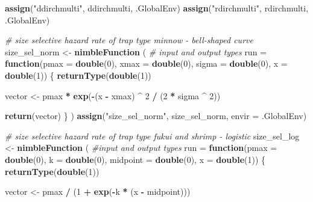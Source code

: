 \documentclass[
]{article}
\newenvironment{Shaded}{\begin{snugshade}}{\end{snugshade}}
\newcommand{\AttributeTok}[1]{\textcolor[rgb]{0.13,0.29,0.53}{#1}}
\newcommand{\CommentTok}[1]{\textcolor[rgb]{0.56,0.35,0.01}{\textit{#1}}}
\newcommand{\ControlFlowTok}[1]{\textcolor[rgb]{0.13,0.29,0.53}{\textbf{#1}}}
\newcommand{\DecValTok}[1]{\textcolor[rgb]{0.00,0.00,0.81}{#1}}
\newcommand{\FunctionTok}[1]{\textcolor[rgb]{0.13,0.29,0.53}{\textbf{#1}}}
\newcommand{\NormalTok}[1]{#1}
\newcommand{\OtherTok}[1]{\textcolor[rgb]{0.56,0.35,0.01}{#1}}
\newcommand{\SpecialCharTok}[1]{\textcolor[rgb]{0.81,0.36,0.00}{\textbf{#1}}}
\newcommand{\StringTok}[1]{\textcolor[rgb]{0.31,0.60,0.02}{#1}}
\begin{document}
\begin{Shaded}
\begin{Highlighting}[]
  \FunctionTok{assign}\NormalTok{(}\StringTok{"ddirchmulti"}\NormalTok{, ddirchmulti, .GlobalEnv)}
  \FunctionTok{assign}\NormalTok{(}\StringTok{"rdirchmulti"}\NormalTok{, rdirchmulti, .GlobalEnv)}
  
  \CommentTok{\# size selective hazard rate of trap type minnow {-} bell{-}shaped curve}
\NormalTok{  size\_sel\_norm }\OtherTok{\textless{}{-}} \FunctionTok{nimbleFunction}\NormalTok{ (}
    \CommentTok{\# input and output types}
    \AttributeTok{run =} \ControlFlowTok{function}\NormalTok{(}\AttributeTok{pmax =} \FunctionTok{double}\NormalTok{(}\DecValTok{0}\NormalTok{), }\AttributeTok{xmax =} \FunctionTok{double}\NormalTok{(}\DecValTok{0}\NormalTok{), }\AttributeTok{sigma =} \FunctionTok{double}\NormalTok{(}\DecValTok{0}\NormalTok{),}
                   \AttributeTok{x =} \FunctionTok{double}\NormalTok{(}\DecValTok{1}\NormalTok{))}
\NormalTok{    \{}
      \FunctionTok{returnType}\NormalTok{(}\FunctionTok{double}\NormalTok{(}\DecValTok{1}\NormalTok{))}
      
\NormalTok{      vector }\OtherTok{\textless{}{-}}\NormalTok{ pmax }\SpecialCharTok{*} \FunctionTok{exp}\NormalTok{(}\SpecialCharTok{{-}}\NormalTok{(x }\SpecialCharTok{{-}}\NormalTok{ xmax) }\SpecialCharTok{\^{}} \DecValTok{2} \SpecialCharTok{/}\NormalTok{ (}\DecValTok{2} \SpecialCharTok{*}\NormalTok{ sigma }\SpecialCharTok{\^{}} \DecValTok{2}\NormalTok{))}
      
      \FunctionTok{return}\NormalTok{(vector)}
\NormalTok{    \}}
\NormalTok{  )}
  \FunctionTok{assign}\NormalTok{(}\StringTok{"size\_sel\_norm"}\NormalTok{, size\_sel\_norm, }\AttributeTok{envir =}\NormalTok{ .GlobalEnv)}
  
  \CommentTok{\# size selective hazard rate of trap type fukui and shrimp {-} logistic}
\NormalTok{  size\_sel\_log }\OtherTok{\textless{}{-}} \FunctionTok{nimbleFunction}\NormalTok{ (}
    \CommentTok{\#input and output types}
    \AttributeTok{run =} \ControlFlowTok{function}\NormalTok{(}\AttributeTok{pmax =} \FunctionTok{double}\NormalTok{(}\DecValTok{0}\NormalTok{), }\AttributeTok{k =} \FunctionTok{double}\NormalTok{(}\DecValTok{0}\NormalTok{), }\AttributeTok{midpoint =} \FunctionTok{double}\NormalTok{(}\DecValTok{0}\NormalTok{),}
                   \AttributeTok{x =} \FunctionTok{double}\NormalTok{(}\DecValTok{1}\NormalTok{))}
\NormalTok{    \{}
      \FunctionTok{returnType}\NormalTok{(}\FunctionTok{double}\NormalTok{(}\DecValTok{1}\NormalTok{))}
      
\NormalTok{      vector }\OtherTok{\textless{}{-}}\NormalTok{ pmax }\SpecialCharTok{/}\NormalTok{ (}\DecValTok{1} \SpecialCharTok{+} \FunctionTok{exp}\NormalTok{(}\SpecialCharTok{{-}}\NormalTok{k }\SpecialCharTok{*}\NormalTok{ (x }\SpecialCharTok{{-}}\NormalTok{ midpoint)))}
      

\end{Highlighting}
\end{Shaded}
\end{document}
